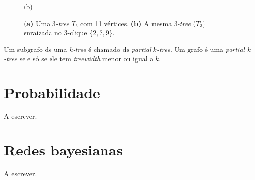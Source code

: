 \begin{definition}
\begin{figure}
\begin{minipage}{0.5\textwidth}

      (b)
    \end{minipage}

    \caption{
      \textbf{(a)} Uma \emph{$3$-tree} $T_3$ com 11 vértices.
      \textbf{(b)} A mesma \emph{$3$-tree} ($T_3$) enraizada no $3$-clique $\{2, 3, 9\}$.
    }
    \label{fig:rootedktree}
  \end{figure}
\end{definition}

\begin{definition}
  \cite{bodlaender} Um subgrafo de uma \emph{$k$-tree} é chamado de \emph{partial $k$-tree}. Um grafo é uma \emph{partial $k$-tree} se e só se ele tem \emph{treewidth} menor ou igual a $k$. %
\end{definition}

\section{Probabilidade}

A escrever. \cite{koller} %

\section{Redes bayesianas}

A escrever. \cite{koller} %


